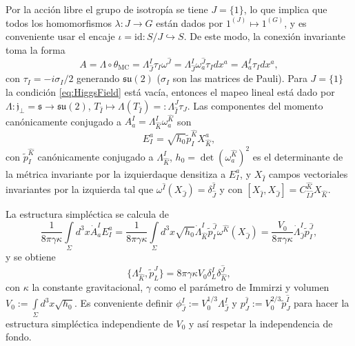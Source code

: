 Por la acci\'{o}n libre el grupo de isotrop\'{i}a se tiene $J=\{1\}$, lo que implica que todos los homomorfismos $\lambda: J \rightarrow G$ est\'{a}n dados por $1^{(J)} \longmapsto 1^{(G)}$, y es conveniente usar el encaje $\iota = \mathrm{id}: S/J \hookrightarrow S$. De este modo, la conexi\'{o}n invariante toma la forma
%
\begin{equation}
A = \Lambda \circ \theta_{\mathrm{MC}} = \Lambda^{I}_{\hat{J}} \tau_{I} \omega^{\hat{J}} =  \Lambda^{I}_{\hat{J}} \omega^{\hat{J}}_{a} \tau_{I} dx^{a}=A^{I}_{a} \tau_{I} dx^{a},
\end{equation}
%
con $\tau_{I} = -i \sigma_{I}/2$ generando $\mathfrak{su}(2)$ ($\sigma_{I}$ son las matrices de Pauli). Para $J=\{1\}$ la condici\'{o}n \eqref{eq:HiggsField} est\'{a} vac\'{i}a, entonces el mapeo lineal est\'{a} dado por $\Lambda: \mathfrak{j}_{\perp} = \mathfrak{s} \longrightarrow \mathfrak{su}(2)$, $T_{\hat{I}} \longmapsto \Lambda(T_{\hat{I}}) =: \Lambda^{J}_{\hat{I}} \tau_{J}$. Las componentes del momento can\'{o}nicamente conjugado a $A^{I}_{a} = \Lambda^{I}_{\hat{K}} \omega^{\hat{K}}_{a}$ son
%
\begin{equation}
E^{a}_{I} = \sqrt{h_{0}} \tilde{p}^{\hat{K}}_{I} X^{a}_{\hat{K}},
\end{equation}
%
con $\tilde{p}^{\hat{K}}_{I}$ can\'{o}nicamente conjugado a $\Lambda^{I}_{\hat{K}}$, $h_{0} = \det(\omega^{\hat{K}}_{a})^{2}$ es el determinante de la m\'{e}trica invariante por la izquierda\footnotemark que densitiza a $E^{a}_{I}$, y $X_{\hat{I}}$ campos vectoriales invariantes por la izquierda tal que $\omega^{\hat{I}}(X_{\hat{J}}) = \delta^{\hat{I}}_{\hat{J}}$ y con $[X_{\hat{I}}, X_{\hat{J}}] = C^{\hat{K}}_{\hat{I} \hat{J}} X_{\hat{K}}$.

La estructura simpl\'{e}ctica se calcula de
%
\begin{equation}
\frac{1}{8 \pi \gamma \kappa} \int\limits_{\Sigma} d^{3} x \dot{A}^{I}_{a} E^{a}_{I} = \frac{1}{8 \pi \gamma \kappa} \int\limits_{\Sigma} d^{3} x \sqrt{h_{0}} \dot{\Lambda}^{I}_{\hat{K}} \tilde{p}^{\hat{J}}_{I} \omega^{\hat{K}} (X_{\hat{J}}) = \frac{V_{0}}{8 \pi \gamma \kappa} \dot{\Lambda}^{I}_{\hat{J}} \tilde{p}^{\hat{J}}_{I},
\end{equation}
%
y se obtiene
%
\begin{equation}
\{\Lambda^{I}_{\hat{K}}, \tilde{p}^{\hat{J}}_{L} \} = 8 \pi \gamma \kappa V_{0} \delta^{I}_{L} \delta^{\hat{J}}_{\hat{K}},
\end{equation}
%
con $\kappa$ la constante gravitacional, $\gamma$ como el par\'{a}metro de Immirzi y volumen $V_{0} := \int\limits_{\Sigma} d^{3} x  \sqrt{h_{0}}$. Es conveniente definir $\phi^{I}_{\hat{J}} := V_{0}^{1/3} \Lambda^{I}_{\hat{J}}$ y $p^{\hat{I}}_{J} := V_{0}^{2/3} \tilde{p}^{\hat{I}}_{J}$ para hacer la estructura simpl\'{e}ctica independiente de $V_{0}$ y as\'{i} respetar la independencia de fondo.

